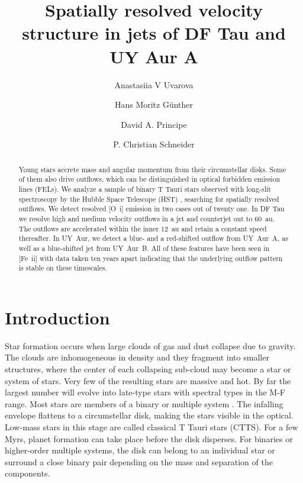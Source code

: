 \documentclass[twocolumn,trackchanges]{aastex63}
\begin{document}
\title{Spatially resolved velocity structure in jets of DF Tau and UY Aur A}



\author{Anastasiia V Uvarova}

\author[0000-0003-4243-2840]{Hans Moritz G\"unther}

\author{David A. Principe}

\author{P. Christian Schneider}

\begin{abstract}
Young stars accrete mass and angular momentum from their circumstellar
disks. Some of them also drive outflows, which can be distinguished in
optical forbidden emission lines (FELs). We analyze a sample of binary
T Tauri stars observed with long-slit spectroscopy by the Hubble Space
Telescope (HST) , searching for spatially resolved outflows. We detect resolved [O~{\sc i}] emission in two cases out of twenty one. In DF Tau we resolve high and medium velocity outflows in a jet and counterjet out to 60~au. The outflows are accelerated within the inner 12~au and retain a constant speed thereafter. In UY~Aur, we detect a blue- and a red-shifted outflow from UY~Aur~A, as well as a blue-shifted jet from UY~Aur~B. All of these features have been seen in [Fe~{\sc ii}] with data taken ten years apart indicating that the underlying outflow pattern is stable on these timescales.
\end{abstract}%


\section{Introduction}
\label{sect:intro}
Star formation occurs when large clouds of gas and dust collapse due to
gravity. The clouds are inhomogeneous in density and they fragment into
smaller structures, where the center of each collapsing sub-cloud may
become a star or system of stars. Very few of the resulting stars are
massive and hot. By far the largest number will evolve into late-type
stars with spectral types in the M-F range. Most stars are members of a binary or multiple system \citep[see e.g.\ review by][]{2007prpl.conf..379D}.
The infalling envelope
flattens to a circumstellar disk, making the stars visible in the
optical. Low-mass stars in this stage are called classical T Tauri stars
(CTTS). For a few Myrs, planet formation can take place before the disk
disperses. For binaries or higher-order multiple systems, the disk can
belong to an individual star or surround a close binary pair depending
on the mass and separation of the components.
\end{document}
